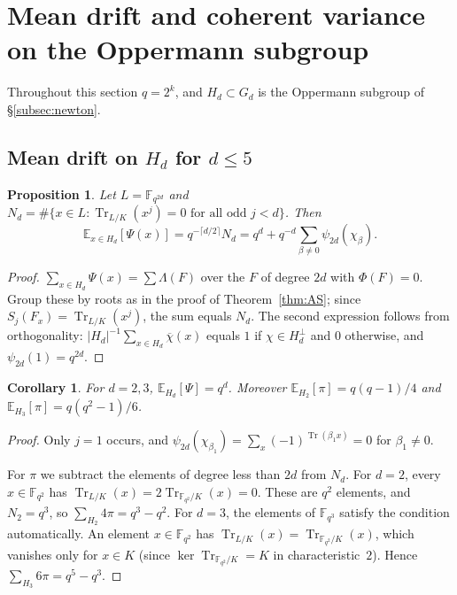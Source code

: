 \documentclass[11pt,a4paper]{amsart}
\newtheorem{proposition}[theorem]{Proposition}
\newtheorem{corollary}[theorem]{Corollary}
\theoremstyle{definition}
\theoremstyle{remark}
\newcommand{\F}{\mathbb{F}}
\newcommand{\Tr}{\operatorname{Tr}}
\newcommand{\E}{\mathbb{E}}
\begin{document}
\FloatBarrier

\section{Mean drift and coherent variance on the Oppermann subgroup}\label{sec:subgroup}
Throughout this section $q=2^k$, and $H_d\subset G_d$ is the Oppermann subgroup of \S\ref{subsec:newton}.

\subsection{\texorpdfstring{Mean drift on $H_d$ for $d\le5$}{Mean drift on the Oppermann subgroup for d at most 5}}\label{sec:mean}

\begin{proposition}\label{prop:mean}
Let $L=\F_{q^{2d}}$ and $N_d=\#\{x\in L:\Tr_{L/K}(x^j)=0\text{ for all odd }j<d\}$. Then
\[
\E_{x\in H_d}[\Psi(x)]=q^{-\lceil d/2\rceil}N_d=q^d+q^{-d}\sum_{\beta\ne0}\psi_{2d}(\chi_\beta).
\]
\end{proposition}

\begin{proof}
$\sum_{x\in H_d}\Psi(x)=\sum\Lambda(F)$ over the $F$ of degree $2d$ with $\Phi(F)=0$. Group these by roots as in the
proof of Theorem~\ref{thm:AS}; since $S_j(F_x)=\Tr_{L/K}(x^j)$, the sum equals $N_d$. The second expression follows
from orthogonality: $|H_d|^{-1}\sum_{x\in H_d}\overline\chi(x)$ equals $1$ if $\chi\in H_d^\perp$ and $0$ otherwise,
and $\psi_{2d}(1)=q^{2d}$.
\end{proof}

\begin{corollary}\label{cor:d23}
For $d=2,3$, $\E_{H_d}[\Psi]=q^d$. Moreover $\E_{H_2}[\pi]=q(q-1)/4$ and $\E_{H_3}[\pi]=q(q^2-1)/6$.
\end{corollary}

\begin{proof}
Only $j=1$ occurs, and $\psi_{2d}(\chi_{\beta_1})=\sum_x(-1)^{\Tr(\beta_1x)}=0$ for $\beta_1\ne0$.

For $\pi$ we subtract the elements of degree less than $2d$ from $N_d$. For $d=2$, every $x\in\F_{q^2}$ has $\Tr_{L/K}(x)=2\Tr_{\F_{q^2}/K}(x)=0$. These are $q^2$ elements, and
$N_2=q^3$, so $\sum_{H_2}4\pi=q^3-q^2$. For $d=3$, the elements of $\F_{q^3}$ satisfy the condition automatically. An
element $x\in\F_{q^2}$ has $\Tr_{L/K}(x)=\Tr_{\F_{q^2}/K}(x)$, which vanishes only for $x\in K$ (since
$\ker\Tr_{\F_{q^2}/K}=K$ in characteristic~$2$). Hence
$\sum_{H_3}6\pi=q^5-q^3$.
\end{proof}
\end{document}
